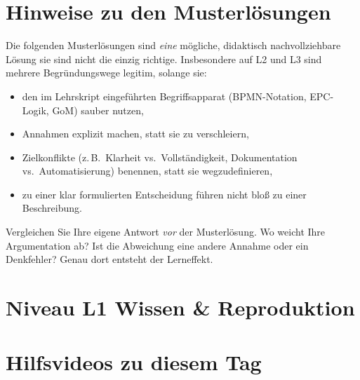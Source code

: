\documentclass[11pt,a4paper,oneside]{article}
\begin{document}
\section*{Hinweise zu den Musterl\"osungen}
\thispagestyle{plain}

\noindent Die folgenden Musterl\"osungen sind \emph{eine} m\"ogliche, didaktisch nachvollziehbare L\"osung \textendash{} sie sind nicht die einzig richtige. Insbesondere auf L2 und L3 sind mehrere Begr\"undungswege legitim, solange sie:

\begin{itemize}
  \item den im Lehrskript eingef\"uhrten Begriffsapparat (BPMN-Notation, EPC-Logik, GoM) sauber nutzen,
  \item Annahmen explizit machen, statt sie zu verschleiern,
  \item Zielkonflikte (z.\,B.\ Klarheit vs.\ Vollst\"andigkeit, Dokumentation vs.\ Automatisierung) benennen, statt sie wegzudefinieren,
  \item zu einer klar formulierten Entscheidung f\"uhren \textendash{} nicht blo{\ss} zu einer Beschreibung.
\end{itemize}

\begin{infobox}
Vergleichen Sie Ihre eigene Antwort \emph{vor} der Musterl\"osung. Wo weicht Ihre Argumentation ab? Ist die Abweichung eine andere Annahme \textendash{} oder ein Denkfehler? Genau dort entsteht der Lerneffekt.
\end{infobox}

\clearpage

\section*{Niveau L1 \textendash{} Wissen \& Reproduktion}

\section*{Hilfsvideos zu diesem Tag}
\thispagestyle{plain}
\end{document}
